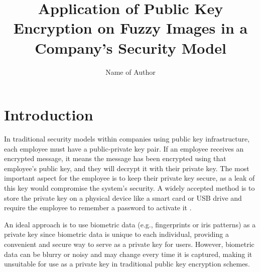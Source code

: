 \documentclass[graybox]{svmult}
\begin{document}
\title*{Application of Public Key Encryption on Fuzzy Images in a
    Company's Security Model}
\author{Name of Author}

\maketitle



\section{Introduction}
In traditional security models within companies using public key infrastructure, each employee must have a public-private key pair. If an employee receives an encrypted message, it means the message has been encrypted using that employee's public key, and they will decrypt it with their private key. The most important aspect for the employee is to keep their private key secure, as a leak of this key would compromise the system's security. A widely accepted method is to store the private key on a physical device like a smart card or USB drive and require the employee to remember a password to activate it \cite{Ellison2000}.

An ideal approach is to use biometric data (e.g., fingerprints or iris patterns) \cite{Connaughton2007} as a private key since biometric data is unique to each individual, providing a convenient and secure way to serve as a private key for users. However, biometric data can be blurry or noisy and may change every time it is captured, making it unsuitable for use as a private key in traditional public key encryption schemes.
\end{document}
